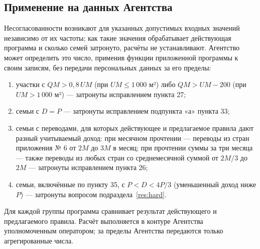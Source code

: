 \documentclass[14pt,a4paper]{extarticle}
\begin{document}
\subsection{Применение на данных Агентства}\label{sec:agency}
Несогласованности возникают для указанных допустимых входных значений независимо от их частоты; как такие значения обрабатывает действующая программа и сколько семей затронуто, расчёты не устанавливают. Агентство может определить это число, применив функции приложенной программы к своим записям, без передачи персональных данных за его пределы:
\begin{enumerate}[leftmargin=1.27cm]
\item участки с $QM>0{,}8\,UM$ (при $UM\le1\,000$ м²) либо $QM>UM-200$ (при $UM>1\,000$ м²) — затронуты исправлением пункта 27;
\item семьи с $D=P$ — затронуты исправлением подпункта «а» пункта 33;
\item семьи с переводами, для которых действующее и предлагаемое правила дают разный учитываемый доход: при месячном прочтении — переводы из стран приложения № 6 от $2M$ до $3M$ в месяц; при прочтении суммы за три месяца — также переводы из любых стран со среднемесячной суммой от $2M/3$ до $2M$ — затронуты исправлением пункта 26;
\item семьи, включённые по пункту 35, с $P<D<4P/3$ (уменьшенный доход ниже $P$) — затронуты вопросом подраздела~\ref{res:hard}.
\end{enumerate}
Для каждой группы программа сравнивает результат действующего и предлагаемого правила. Расчёт выполняется в контуре Агентства уполномоченным оператором; за пределы Агентства передаются только агрегированные числа.
\end{document}
